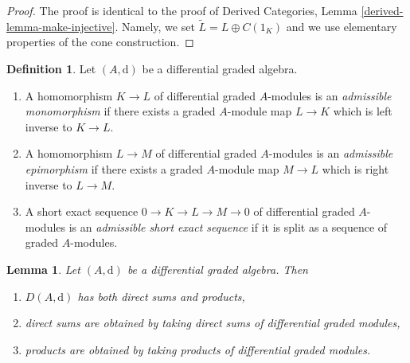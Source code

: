 \documentclass{stacks-project}
\theoremstyle{plain}
\newtheorem{lemma}[subsection]{Lemma}
\theoremstyle{definition}
\newtheorem{definition}[subsection]{Definition}
\theoremstyle{remark}
\numberwithin{equation}{subsection}
\begin{document}
\begin{proof}
The proof is identical to the proof of
Derived Categories, Lemma \ref{derived-lemma-make-injective}.
Namely, we set $\tilde L = L \oplus C(1_K)$ and we use elementary
properties of the cone construction.
\end{proof}

\begin{definition}
\label{definition-admissible-ses}
Let $(A, \text{d})$ be a differential graded algebra.
\begin{enumerate}
\item A homomorphism $K \to L$ of differential graded $A$-modules
is an {\it admissible monomorphism} if there exists a graded $A$-module
map $L \to K$ which is left inverse to $K \to L$.
\item A homomorphism $L \to M$ of differential graded $A$-modules
is an {\it admissible epimorphism} if there exists a graded $A$-module
map $M \to L$ which is right inverse to $L \to M$.
\item A short exact sequence $0 \to K \to L \to M \to 0$ of differential
graded $A$-modules is an {\it admissible short exact sequence}
if it is split as a sequence of graded $A$-modules.
\end{enumerate}
\end{definition}

\begin{lemma}
\label{lemma-derived-products}
Let $(A, \text{d})$ be a differential graded algebra. Then
\begin{enumerate}
\item $D(A, \text{d})$ has both direct sums and products,
\item direct sums are obtained by taking direct sums of differential graded
modules,
\item products are obtained by taking products of differential
graded modules.
\end{enumerate}
\end{lemma}
\end{document}
